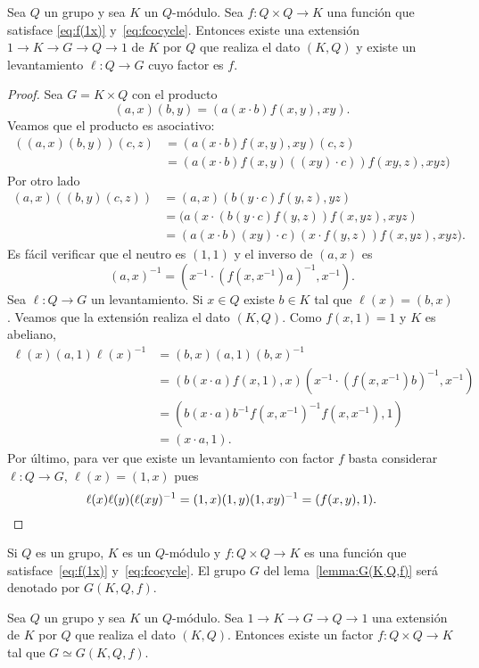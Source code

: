 \begin{lemma}
	\label{lemma:G(K,Q,f)}
	Sea $Q$ un grupo y sea $K$ un $Q$-módulo. Sea $f\colon Q\times Q\to K$ una
	función que satisface \eqref{eq:f(1x)} y~\eqref{eq:fcocycle}. Entonces
	existe una extensión $1\to K\to G\to Q\to 1$ de $K$ por $Q$ que realiza el
	dato $(K,Q)$ y existe un levantamiento $\ell\colon Q\to G$ cuyo factor es
	$f$.
\end{lemma}

\begin{proof}
	Sea $G=K\times Q$ con el producto
	\[
		(a,x)(b,y)=(a(x\cdot b)f(x,y),xy).
	\]
	Veamos que el producto es asociativo:
	\begin{align*}
		((a,x)(b,y))(c,z)&=(a(x\cdot b)f(x,y),xy)(c,z)\\
		&=(a(x\cdot b)f(x,y)((xy)\cdot c))f(xy,z),xyz)
	\end{align*}
	Por otro lado
	\begin{align*}
		(a,x)((b,y)(c,z)) &= (a,x)(b(y\cdot c)f(y,z),yz)\\
		&=(a(x\cdot (b(y\cdot c)f(y,z))f(x,yz),xyz)\\
		&=(a(x\cdot b)(xy)\cdot c)(x\cdot f(y,z))f(x,yz),xyz).
	\end{align*}
	Es fácil verificar que el neutro es $(1,1)$ y el inverso de $(a,x)$ es 
	\[
	(a,x)^{-1}=(x^{-1}\cdot (f(x,x^{-1})a)^{-1},x^{-1}).
	\]
	Sea $\ell\colon Q\to G$ un levantamiento. Si $x\in Q$ existe $b\in K$ tal
	que $\ell(x)=(b,x)$. Veamos que la extensión realiza el dato $(K,Q)$. Como
	$f(x,1)=1$ y $K$ es abeliano, 
	\begin{align*}
		\ell(x)(a,1)\ell(x)^{-1}
		&=(b,x)(a,1)(b,x)^{-1}\\
		&=(b(x\cdot a)f(x,1),x)(x^{-1}\cdot (f(x,x^{-1})b)^{-1},x^{-1})\\
		&=(b(x\cdot a)b^{-1}f(x,x^{-1})^{-1}f(x,x^{-1}),1)\\
		&=(x\cdot a,1).
	\end{align*}
	Por último, para ver que existe un levantamiento con factor $f$ basta
	considerar $\ell\colon Q\to G$, $\ell(x)=(1,x)$ pues 
	\[
		\ell(x)\ell(y)(\ell(xy)^{-1}=(1,x)(1,y)(1,xy)^{-1}=(f(x,y),1).\qedhere
	\]
\end{proof}

Si $Q$ es un grupo, $K$ es un $Q$-módulo y $f\colon Q\times Q\to K$ es una
función que satisface~\eqref{eq:f(1x)} y~\eqref{eq:fcocycle}. El grupo $G$ del
lema~\ref{lemma:G(K,Q,f)} será denotado por $G(K,Q,f)$. 

\begin{lemma}
	\label{lemma:existe_f}
	Sea $Q$ un grupo y sea $K$ un $Q$-módulo. Sea $1\to K\to G\to Q\to 1$ una
	extensión de $K$ por $Q$ que realiza el dato $(K,Q)$. Entonces existe
	un factor $f\colon Q\times Q\to K$ tal que $G\simeq G(K,Q,f)$. 
\end{lemma}


